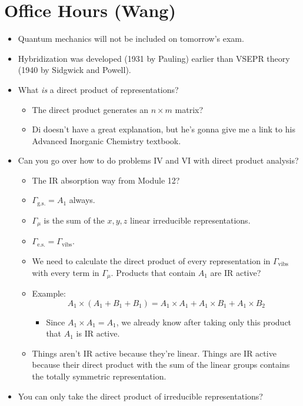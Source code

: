 \documentclass[../notes.tex]{subfiles}
\begin{document}
\section{Office Hours (Wang)}
\begin{itemize}
    \item Quantum mechanics will not be included on tomorrow's exam.
    \item Hybridization was developed (1931 by Pauling) earlier than VSEPR theory (1940 by Sidgwick and Powell).
    \item What \emph{is} a direct product of representations?
    \begin{itemize}
        \item The direct product generates an $n\times m$ matrix?
        \item Di doesn't have a great explanation, but he's gonna give me a link to his Advanced Inorganic Chemistry textbook.
    \end{itemize}
    \item Can you go over how to do problems IV and VI with direct product analysis?
    \begin{itemize}
        \item The IR absorption way from Module 12?
        \item $\Gamma_\text{g.s.}=A_1$ always.
        \item $\Gamma_\mu$ is the sum of the $x,y,z$ linear irreducible representations.
        \item $\Gamma_\text{e.s.}=\Gamma_\text{vibs}$.
        \item We need to calculate the direct product of every representation in $\Gamma_\text{vibs}$ with every term in $\Gamma_\mu$. Products that contain $A_1$ are IR active?
        \item Example:
        \begin{equation*}
            A_1\times(A_1+B_1+B_1) = A_1\times A_1+A_1\times B_1+A_1\times B_2
        \end{equation*}
        \begin{itemize}
            \item Since $A_1\times A_1=A_1$, we already know after taking only this product that $A_1$ is IR active.
        \end{itemize}
        \item Things aren't IR active because they're linear. Things are IR active because their direct product with the sum of the linear groups contains the totally symmetric representation.
    \end{itemize}
    \item You can only take the direct product of irreducible representations?
\end{itemize}
\end{document}

